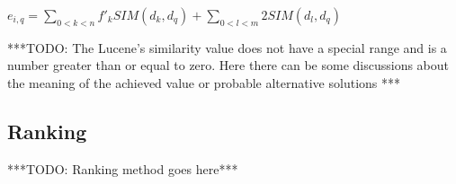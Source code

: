 \begin{center}
$e_{i,q} = \sum_{0<k<n} f'_k SIM(d_k, d_q) + \sum_{0<l<m} 2 SIM(d_l, d_q) $ \\
\end{center}

***TODO: The Lucene's similarity value does not have a special range and is a number greater than or equal to zero. Here there can be some discussions about the meaning of the achieved value or probable alternative solutions ***

\subsection{Ranking}
***TODO: Ranking method goes here***